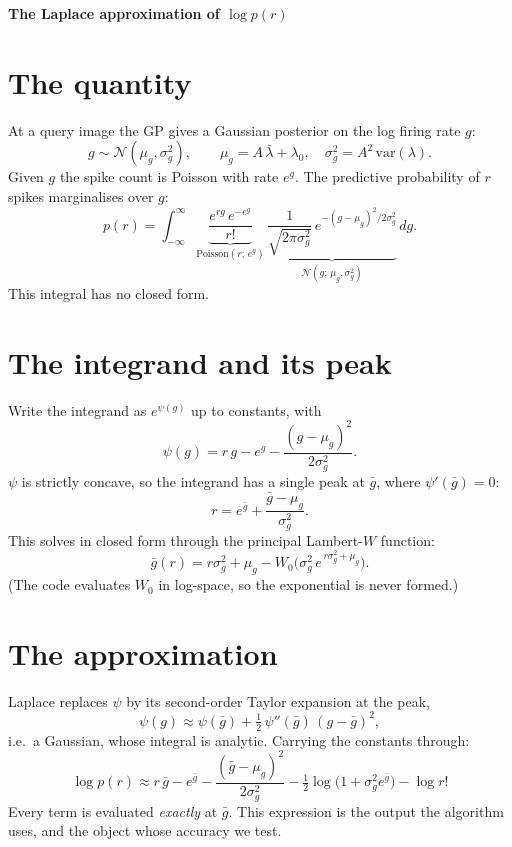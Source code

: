 \documentclass[11pt]{article}
\newcommand{\gbar}{\bar{g}}
\begin{document}
\begin{center}
{\large\bfseries The Laplace approximation of $\log p(r)$}
\end{center}
\medskip

\section{The quantity}
At a query image the GP gives a Gaussian posterior on the log firing rate $g$:
\[
  g \sim \mathcal{N}(\mu_g,\sigma_g^2),\qquad
  \mu_g = A\,\bar\lambda + \lambda_0,\quad \sigma_g^2 = A^2\,\mathrm{var}(\lambda).
\]
Given $g$ the spike count is Poisson with rate $e^{g}$. The predictive
probability of $r$ spikes marginalises over $g$:
\[
  p(r) = \int_{-\infty}^{\infty}
         \underbrace{\frac{e^{rg}\,e^{-e^{g}}}{r!}}_{\mathrm{Poisson}(r;\,e^{g})}\,
         \underbrace{\frac{1}{\sqrt{2\pi\sigma_g^2}}\,
           e^{-(g-\mu_g)^2/2\sigma_g^2}}_{\mathcal{N}(g;\,\mu_g,\sigma_g^2)}
         \,dg .
\]
This integral has no closed form.

\section{The integrand and its peak}
Write the integrand as $e^{\psi(g)}$ up to constants, with
\[
  \psi(g) = r\,g - e^{g} - \frac{(g-\mu_g)^2}{2\sigma_g^2}.
\]
$\psi$ is strictly concave, so the integrand has a single peak at $\gbar$,
where $\psi'(\gbar)=0$:
\[
  r = e^{\gbar} + \frac{\gbar-\mu_g}{\sigma_g^2}.
\]
This solves in closed form through the principal Lambert-$W$ function:
\[
  \gbar(r) = r\sigma_g^2 + \mu_g - W_0\!\big(\sigma_g^2\,e^{\,r\sigma_g^2+\mu_g}\big).
\]
(The code evaluates $W_0$ in log-space, so the exponential is never formed.)

\section{The approximation}
Laplace replaces $\psi$ by its second-order Taylor expansion at the peak,
\[
  \psi(g)\approx \psi(\gbar) + \tfrac12\,\psi''(\gbar)\,(g-\gbar)^2,
\]
i.e.\ a Gaussian, whose integral is analytic. Carrying the constants through:
\[
  \boxed{\;\log p(r) \approx
    r\,\gbar - e^{\gbar}
    - \frac{(\gbar-\mu_g)^2}{2\sigma_g^2}
    - \tfrac12\log\!\big(1+\sigma_g^2 e^{\gbar}\big)
    - \log r!\;}
\]
Every term is evaluated \emph{exactly} at $\gbar$. This expression is the
output the algorithm uses, and the object whose accuracy we test.
\end{document}
